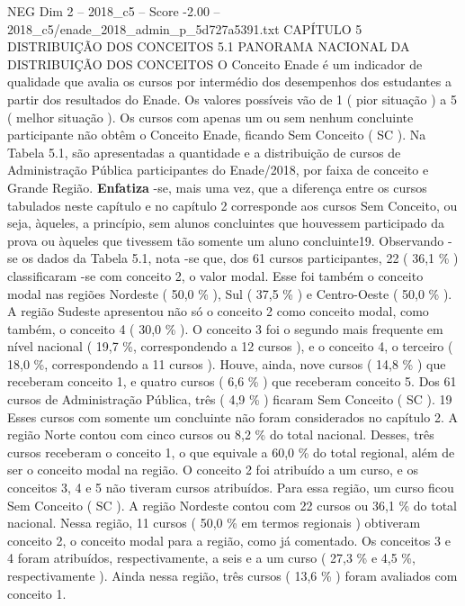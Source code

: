 \begin{textsample}{NEG Dim 2 – 2018\_c5 – Score -2.00 – 2018\_c5/enade\_2018\_admin\_p\_5d727a5391.txt}  \label{ex:f2_neg_113}
CAPÍTULO 5 DISTRIBUIÇÃO DOS CONCEITOS 5.1 PANORAMA NACIONAL DA DISTRIBUIÇÃO DOS CONCEITOS O Conceito Enade é um indicador de qualidade que avalia os cursos por intermédio dos desempenhos dos estudantes a partir dos resultados do Enade.
Os valores possíveis vão de 1 ( pior situação ) a 5 ( melhor situação ).
Os cursos com apenas um ou sem nenhum concluinte participante não obtêm o Conceito Enade, ficando Sem Conceito ( SC ).
Na Tabela 5.1, são apresentadas a quantidade e a distribuição de cursos de Administração Pública participantes do Enade/2018, por faixa de conceito e Grande Região. \textbf{Enfatiza} -se, mais uma vez, que a diferença entre os cursos tabulados neste capítulo e no capítulo 2 corresponde aos cursos Sem Conceito, ou seja, àqueles, a princípio, sem alunos concluintes que houvessem participado da prova ou àqueles que tivessem tão somente um aluno concluinte19.
Observando -se os dados da Tabela 5.1, nota -se que, dos 61 cursos participantes, 22 ( 36,1 \% ) classificaram -se com conceito 2, o valor modal.
Esse foi também o conceito modal nas regiões Nordeste ( 50,0 \% ), Sul ( 37,5 \% ) e Centro-Oeste ( 50,0 \% ).
A região Sudeste apresentou não só o conceito 2 como conceito modal, como também, o conceito 4 ( 30,0 \% ).
O conceito 3 foi o segundo mais frequente em nível nacional ( 19,7 \%, correspondendo a 12 cursos ), e o conceito 4, o terceiro ( 18,0 \%, correspondendo a 11 cursos ).
Houve, ainda, nove cursos ( 14,8 \% ) que receberam conceito 1, e quatro cursos ( 6,6 \% ) que receberam conceito 5.
Dos 61 cursos de Administração Pública, três ( 4,9 \% ) ficaram Sem Conceito ( SC ). 19 Esses cursos com somente um concluinte não foram considerados no capítulo 2.
A região Norte contou com cinco cursos ou 8,2 \% do total nacional.
Desses, três cursos receberam o conceito 1, o que equivale a 60,0 \% do total regional, além de ser o conceito modal na região.
O conceito 2 foi atribuído a um curso, e os conceitos 3, 4 e 5 não tiveram cursos atribuídos.
Para essa região, um curso ficou Sem Conceito ( SC ).
A região Nordeste contou com 22 cursos ou 36,1 \% do total nacional.
Nessa região, 11 cursos ( 50,0 \% em termos regionais ) obtiveram conceito 2, o conceito modal para a região, como já comentado.
Os conceitos 3 e 4 foram atribuídos, respectivamente, a seis e a um curso ( 27,3 \% e 4,5 \%, respectivamente ).
Ainda nessa região, três cursos ( 13,6 \% ) foram avaliados com conceito 1.

\end{textsample}
